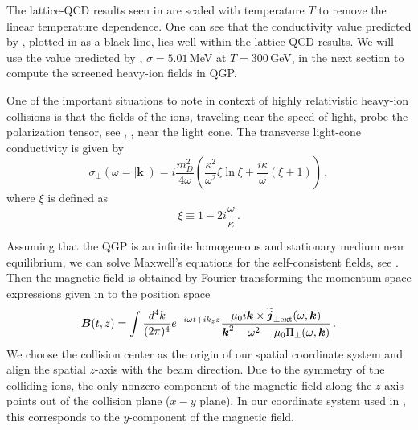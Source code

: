The  lattice-QCD results seen in   \cite{Amato:2013naa,Aarts:2014nba,Brandt:2015aqk,Astrakhantsev:2019zkr} are scaled with temperature $T$ to remove the linear temperature dependence. One can see that the conductivity value predicted by , plotted in  as a black line, lies well within the lattice-QCD results. We will use the value predicted by , $\sigma = 5.01\,$MeV at $T=300\,$GeV, in the next section to compute the screened heavy-ion fields in QGP.

One of the important situations to note in context of highly relativistic heavy-ion collisions  is that the fields of the ions, traveling near the speed of light, probe the polarization tensor, see , , near the light cone. The transverse light-cone conductivity is given by
\begin{equation}\label{eq:lightcone}
    \sigma_\perp (\omega = |\boldsymbol{k}|)  =  i \frac{m_D^2}{4 \omega}\left( \frac{\kappa^2}{\omega^2} \xi \ln\xi +\frac{i\kappa}{\omega}\left(\xi+1\right)\right)\,,
\end{equation}
where $\xi$ is defined as
\begin{equation}\label{eq:xidef}
    \xi \equiv 1- 2i \frac{\omega}{\kappa}\,.
\end{equation}

Assuming that the QGP is an infinite homogeneous and stationary medium near equilibrium, we can solve Maxwell's equations for the self-consistent fields, see . Then the magnetic field is obtained by  Fourier transforming the momentum space expressions given in  to the position space
\begin{equation}\label{eq:magorgin}
   \boldsymbol{B}(t, z) = \int \frac{d^4k}{(2\pi)^4}  e^{-i\omega t+ik_z z}
 \frac{\mu_0 i \boldsymbol{k} \times\widetilde{\boldsymbol{j}}_{\perp \text{ext}}(\omega, \boldsymbol{k})}{\boldsymbol{k}^2 - \omega^2 - \mu_0 \Pi_{\perp}(\omega, \boldsymbol{k})}\,.
\end{equation}
We choose the collision center as the origin of our spatial coordinate system and align the spatial $z$-axis with the beam direction. Due to the symmetry of the colliding ions, the only nonzero component of the magnetic field along the $z$-axis points out of the collision plane ($x-y$ plane). In our coordinate system used in \cite{Grayson:2022asf}, this corresponds to the $y$-component of the magnetic field. 


